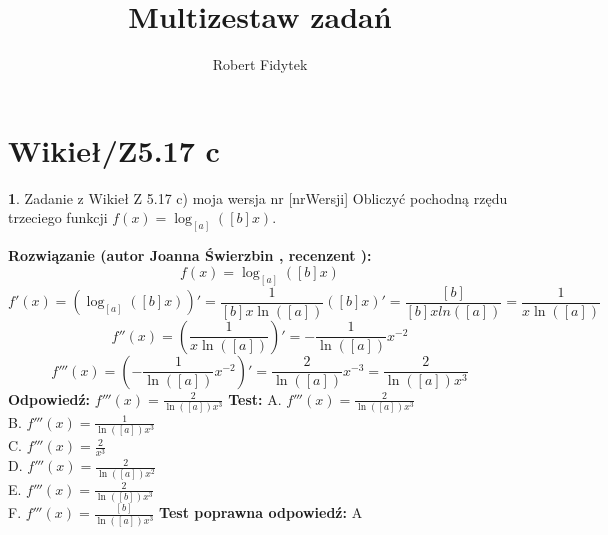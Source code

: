\documentclass[12pt, a4paper]{article}
\title{Multizestaw zadań}
\author{Robert Fidytek}
\date{}
\theoremstyle{definition} %
\newtheorem{zad}{}
\newcommand{\kategoria}[1]{\section{#1}} %
\newcommand{\zadStart}[1]{\begin{zad}#1\newline} %
\newcommand{\zadStop}{\end{zad}}   %
\newcommand{\rozwStart}[2]{\noindent \textbf{Rozwiązanie (autor #1 , recenzent #2): }\newline} %
\newcommand{\rozwStop}{\newline}                                            %
\newcommand{\odpStart}{\noindent \textbf{Odpowiedź:}\newline}    %
\newcommand{\odpStop}{\newline}                                             %
\newcommand{\testStart}{\noindent \textbf{Test:}\newline} %
\newcommand{\testStop}{\newline} %
\newcommand{\kluczStart}{\noindent \textbf{Test poprawna odpowiedź:}\newline} %
\newcommand{\kluczStop}{\newline} %
\begin{document}
\maketitle


\kategoria{Wikieł/Z5.17 c}
\zadStart{Zadanie z Wikieł Z 5.17 c) moja wersja nr [nrWersji]}
Obliczyć pochodną rzędu trzeciego funkcji $f(x)=\log_{[a]}([b]x)$.
\zadStop
\rozwStart{Joanna Świerzbin}{}
$$f(x)=\log_{[a]}([b]x)$$
$$f'(x)= \left(\log_{[a]}([b]x) \right)' = \frac{1}{[b]x\ln([a])}([b]x)'=\frac{[b]}{[b]xln([a])}=\frac{1}{x\ln([a])}$$
$$f''(x)= \left( \frac{1}{x\ln([a])} \right)'= -\frac{1}{\ln([a])} x^{-2}$$
$$f'''(x)= \left( -\frac{1}{\ln([a])} x^{-2} \right)'= \frac{2}{\ln([a])}x^{-3} = \frac{2}{\ln([a])x^{3}} $$
\rozwStop
\odpStart
$f'''(x) =  \frac{2}{\ln([a])x^{3}} $
\odpStop
\testStart
A. $f'''(x) = \frac{2}{\ln([a])x^{3}} $\\
B. $f'''(x) = \frac{1}{\ln([a])x^{3}} $ \\
C. $f'''(x) = \frac{2}{x^{3}} $\\
D. $f'''(x) = \frac{2}{\ln([a])x^{2}} $\\
E. $f'''(x) = \frac{2}{\ln([b])x^{3}} $\\
F. $f'''(x) = \frac{[b]}{\ln([a])x^{3}} $
\testStop
\kluczStart
A
\kluczStop
\end{document}
